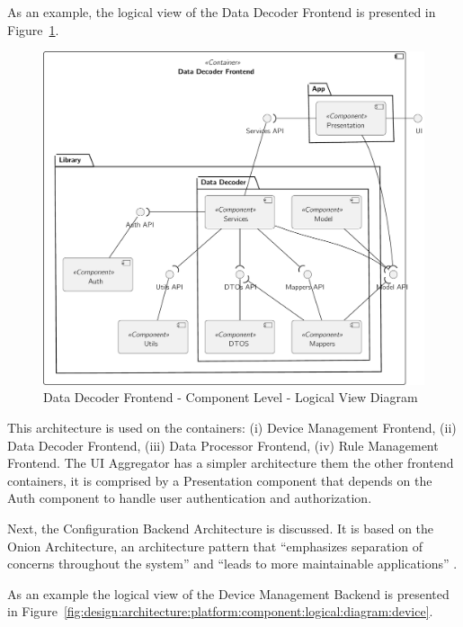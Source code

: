 As an example, the logical view of the Data Decoder Frontend is presented in Figure~\ref{fig:design:architecture:platform:component:logical:diagram:decoder}.

\begin{figure}[H]
   \centering
   \includegraphics[page=1,width=0.7\columnwidth]{assets/diagrams/design/architectural/level3/logical/data-decoder-frontend.pdf}
   \caption[Data Decoder Frontend - Component Level - Logical View Diagram]{Data Decoder Frontend - Component Level - Logical View Diagram}
   \label{fig:design:architecture:platform:component:logical:diagram:decoder}
\end{figure}

This architecture is used on the containers: (i) Device Management Frontend, (ii) Data Decoder Frontend, (iii) Data Processor Frontend, (iv) Rule Management Frontend. The UI Aggregator has a simpler architecture them the other frontend containers, it is comprised by a Presentation component that depends on the Auth component to handle user authentication and authorization.

Next, the Configuration Backend Architecture is discussed. It is based on the Onion Architecture, an architecture pattern that ``emphasizes separation of concerns throughout the system'' and ``leads to more maintainable applications'' \parencite{onion}.

As an example the logical view of the Device Management Backend is presented in Figure~\ref{fig:design:architecture:platform:component:logical:diagram:device}.


